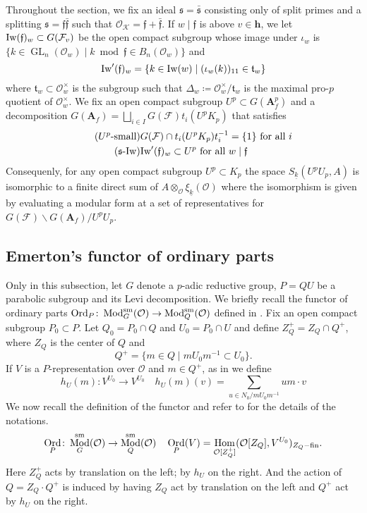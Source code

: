 \documentclass[leqno]{amsart}
\theoremstyle{definition}
\theoremstyle{remark}
\newcommand{\oo}{\mathcal{O}}
\newcommand{\A}{\mathbf A}
\newcommand{\finite}{\mathbf{h}}
\DeclareMathOperator{\Hom}{Hom}
\DeclareMathOperator{\GL}{GL}
\newcommand{\ff}{\mathfrak{f}}
\newcommand{\fs}{\mathfrak{s}}
\newcommand{\ft}{\mathfrak{t}}
\DeclareMathOperator{\Mod}{\textnormal{Mod}}
\DeclareMathOperator{\Ord}{Ord} %
\newcommand{\sm}{\textnormal{sm}}
\newcommand{\F}{{\mathcal{F}}} %
\newcommand{\K}{{\mathcal{K}}} %
\newcommand{\wt}[1]{\underline{ #1 }}
\newcommand{\Iw}{\textnormal{Iw}} %
\begin{document}
Throughout the section,
we fix an ideal
$\fs=\bar{\fs}$ consisting only of 
split primes and  
a splitting $\fs=\ff\bar{\ff}$ such that $\oo_\K=\ff+\bar{\ff}$.
If $w\mid\ff$ is above $v\in\finite$, we let
$\Iw(\ff)_w\subset G(\F_v)$ be the open compact subgroup
whose image under $\iota_w$
is $\{k\in \GL_n(\oo_w)\mid k \bmod \ff \in B_n(\oo_w)\}$
and 
\begin{equation}\label{eq:Iwahori_s}
\Iw'(\ff)_w=\{k\in \Iw(w)\mid (\iota_w(k))_{11}\in \ft_w\}
\end{equation}
where $\ft_w\subset \oo_w^\times$ is the subgroup such 
that $\Delta_w\coloneqq \oo_w^\times/\ft_w$
is the maximal pro-$p$ quotient of  $\oo_w^\times$.
We fix an open compact subgroup 
$U^p\subset G(\A_f^p)$ 
and a decomposition 
$G(\A_f)=\bigsqcup_{i\in I} G(\F)t_i (U^pK_p)$
that satisfies
\begin{align}
    \label{cond:small}\tag{$U^p$-\text{small}}
	&G(\F)\cap t_i(U^pK_p)t_i^{-1}=\{1\} \text{ for all } i \\
    \label{cond:s-ram}\tag{$\fs$-\Iw}
    &\Iw'(\ff)_w\subset U^p \text{ for all } w\mid \ff
\end{align}
Consequenly,
for any open compact subgroup $U^p\subset K_p$
the space $S_{\wt{k}}(U^pU_p,A)$ is
isomorphic to a finite direct sum of 
$A\otimes_{\oo}\xi_{\wt{k}}(\oo)$
where the isomorphism is given by 
evaluating a modular form at a set of representatives
for $G(\F)\backslash G(\A_f)/U^pU_p$.

\subsection{Emerton's functor of ordinary parts}

Only in this subsection,
let $G$ denote a  $p$-adic reductive group,
$P=QU$ be a parabolic subgroup
and its Levi decomposition.
We briefly recall the functor
of ordinary parts 
$\Ord_P\colon \Mod_G^{\sm}(\oo)\to \Mod_Q^{\sm}(\oo)$
defined in \cite{emeI}.
Fix an open compact subgroup $P_0\subset P$.
Let  $Q_0=P_0\cap Q$ and $U_0=P_0\cap U$
and define $Z_Q^+=Z_Q\cap Q^+$,
where  $Z_Q$ is the center of $Q$ and
\[
	Q^+=\{m\in Q\mid mU_0m^{-1}\subset U_0\}.
\]
If  $V$ is a $P$-representation over $\oo$
and  $m\in Q^+$,
as in \cite[Def 3.1.3]{emeI} we define
\begin{equation}\label{def:hUm}
	 h_{U}(m)\colon V^{U_0}\to V^{U_0}\quad
	 h_{U}(m)(v)=\sum_{u\in N_0/m U_0 m^{-1}}um\cdot v
\end{equation}
We now recall the definition of the functor
and refer to \cite[Def 3.1.3]{emeI}
for the details of the notations.
\begin{equation}\label{def:OrdP}
	\Ord_P\colon \Mod_G^{\sm}(\oo)\to \Mod_Q^{\sm}(\oo)\quad
	\Ord_P(V)=\Hom_{\oo[Z_Q^+]}
    (\oo[Z_Q], V^{U_0})_{Z_Q-\textnormal{fin}}.
\end{equation}
Here $Z_Q^+$ acts by translation on the left; 
by $h_U$ on the right.
And the action of $Q=Z_Q\cdot Q^+$ is induced by 
having $Z_Q$ act by translation on the left and 
$Q^+$ act by $h_U$ on the right.
\end{document}
